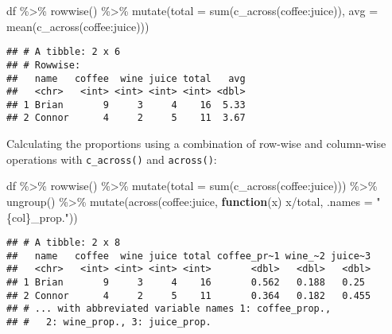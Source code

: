 \documentclass[
]{book}
\newenvironment{Shaded}{\begin{snugshade}}{\end{snugshade}}
\newcommand{\AttributeTok}[1]{\textcolor[rgb]{0.77,0.63,0.00}{#1}}
\newcommand{\ControlFlowTok}[1]{\textcolor[rgb]{0.13,0.29,0.53}{\textbf{#1}}}
\newcommand{\FunctionTok}[1]{\textcolor[rgb]{0.00,0.00,0.00}{#1}}
\newcommand{\NormalTok}[1]{#1}
\newcommand{\SpecialCharTok}[1]{\textcolor[rgb]{0.00,0.00,0.00}{#1}}
\newcommand{\StringTok}[1]{\textcolor[rgb]{0.31,0.60,0.02}{#1}}
\begin{document}
\begin{Shaded}
\begin{Highlighting}[]
\NormalTok{df }\SpecialCharTok{\%\textgreater{}\%} \FunctionTok{rowwise}\NormalTok{() }\SpecialCharTok{\%\textgreater{}\%} \FunctionTok{mutate}\NormalTok{(}\AttributeTok{total =} \FunctionTok{sum}\NormalTok{(}\FunctionTok{c\_across}\NormalTok{(coffee}\SpecialCharTok{:}\NormalTok{juice)),}
                            \AttributeTok{avg =} \FunctionTok{mean}\NormalTok{(}\FunctionTok{c\_across}\NormalTok{(coffee}\SpecialCharTok{:}\NormalTok{juice)))}
\end{Highlighting}
\end{Shaded}

\begin{verbatim}
## # A tibble: 2 x 6
## # Rowwise: 
##   name   coffee  wine juice total   avg
##   <chr>   <int> <int> <int> <int> <dbl>
## 1 Brian       9     3     4    16  5.33
## 2 Connor      4     2     5    11  3.67
\end{verbatim}

Calculating the proportions using a combination of row-wise and column-wise operations with \texttt{c\_across()} and \texttt{across()}:

\begin{Shaded}
\begin{Highlighting}[]
\NormalTok{df }\SpecialCharTok{\%\textgreater{}\%} \FunctionTok{rowwise}\NormalTok{() }\SpecialCharTok{\%\textgreater{}\%} \FunctionTok{mutate}\NormalTok{(}\AttributeTok{total =} \FunctionTok{sum}\NormalTok{(}\FunctionTok{c\_across}\NormalTok{(coffee}\SpecialCharTok{:}\NormalTok{juice))) }\SpecialCharTok{\%\textgreater{}\%}
  \FunctionTok{ungroup}\NormalTok{() }\SpecialCharTok{\%\textgreater{}\%}
  \FunctionTok{mutate}\NormalTok{(}\FunctionTok{across}\NormalTok{(coffee}\SpecialCharTok{:}\NormalTok{juice, }\ControlFlowTok{function}\NormalTok{(x) x}\SpecialCharTok{/}\NormalTok{total,}
                \AttributeTok{.names =} \StringTok{"\{col\}\_prop."}\NormalTok{))}
\end{Highlighting}
\end{Shaded}

\begin{verbatim}
## # A tibble: 2 x 8
##   name   coffee  wine juice total coffee_pr~1 wine_~2 juice~3
##   <chr>   <int> <int> <int> <int>       <dbl>   <dbl>   <dbl>
## 1 Brian       9     3     4    16       0.562   0.188   0.25 
## 2 Connor      4     2     5    11       0.364   0.182   0.455
## # ... with abbreviated variable names 1: coffee_prop.,
## #   2: wine_prop., 3: juice_prop.
\end{verbatim}
\end{document}
